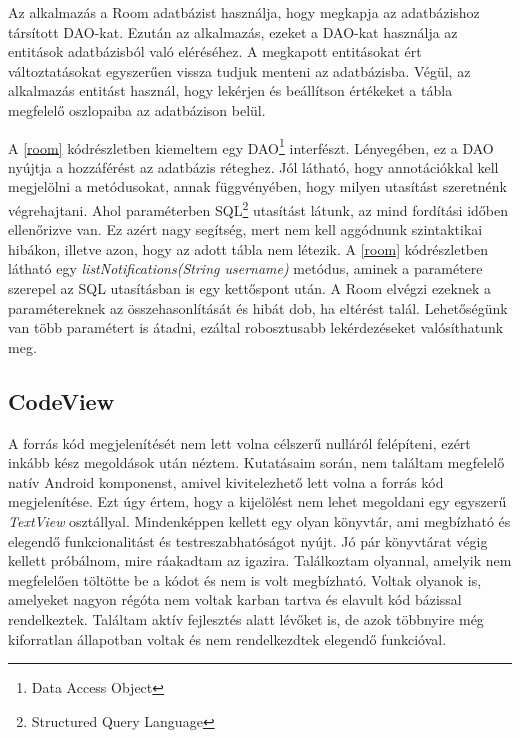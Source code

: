 \documentclass{thesis-ekf}
\theoremstyle{definition}
\theoremstyle{remark}
\begin{document}
Az alkalmazás a Room adatbázist használja, hogy megkapja az adatbázishoz társított DAO-kat.
Ezután az alkalmazás, ezeket a DAO-kat használja az entitások adatbázisból való eléréséhez.
A megkapott entitásokat ért változtatásokat egyszerűen vissza tudjuk menteni az adatbázisba.
Végül, az alkalmazás entitást használ, hogy lekérjen és beállítson értékeket a tábla megfelelő oszlopaiba az adatbázison belül.\cite{room}

A \ref{room} kódrészletben kiemeltem egy DAO\footnote{Data Access Object} interfészt.
Lényegében, ez a DAO nyújtja a hozzáférést az adatbázis réteghez.
Jól látható, hogy annotációkkal kell megjelölni a metódusokat, annak függvényében, hogy milyen utasítást szeretnénk végrehajtani.
Ahol paraméterben SQL\footnote{Structured Query Language} utasítást látunk, az mind fordítási időben ellenőrizve van.
Ez azért nagy segítség, mert nem kell aggódnunk szintaktikai hibákon, illetve azon, hogy az adott tábla nem létezik.
A \ref{room} kódrészletben látható egy \emph{listNotifications(String username)} metódus, aminek a paramétere szerepel az SQL utasításban is egy kettőspont után.
A Room elvégzi ezeknek a paramétereknek az összehasonlítását és hibát dob, ha eltérést talál.
Lehetőségünk van több paramétert is átadni, ezáltal robosztusabb lekérdezéseket valósíthatunk meg.



\subsection{CodeView}\label{code_view}

A forrás kód megjelenítését nem lett volna célszerű nulláról felépíteni, ezért inkább kész megoldások után néztem.
Kutatásaim során, nem találtam megfelelő natív Android komponenst, amivel kivitelezhető lett volna a forrás kód megjelenítése.
Ezt úgy értem, hogy a kijelölést nem lehet megoldani egy egyszerű \emph{TextView} osztállyal.
Mindenképpen kellett egy olyan könyvtár, ami megbízható és elegendő funkcionalitást és testreszabhatóságot nyújt.
Jó pár könyvtárat végig kellett próbálnom, mire ráakadtam az igazira.
Találkoztam olyannal, amelyik nem megfelelően töltötte be a kódot és nem is volt megbízható.
Voltak olyanok is, amelyeket nagyon régóta nem voltak karban tartva és elavult kód bázissal rendelkeztek.
Találtam aktív fejlesztés alatt lévőket is, de azok többnyire még kiforratlan állapotban voltak és nem rendelkezdtek elegendő funkcióval.
\end{document}
